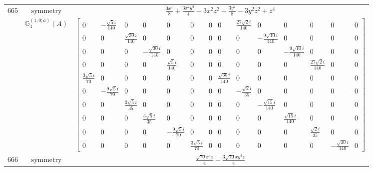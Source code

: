 \documentclass[fleqn,8pt,landscape]{jsarticle}
\begin{document}
\begin{longtable}{ccc}
$ 665 $ & $ \text{symmetry} $ & $ \frac{3 x^{4}}{8} + \frac{3 x^{2} y^{2}}{4} - 3 x^{2} z^{2} + \frac{3 y^{4}}{8} - 3 y^{2} z^{2} + z^{4} $ \\
$  $ & $ \mathbb{G}_{4}^{(1,0;a)}(A) $ & $ \begin{bmatrix} 0 & - \frac{\sqrt{5} i}{140} & 0 & 0 & 0 & 0 & 0 & 0 & \frac{27 \sqrt{2} i}{140} & 0 & 0 & 0 & 0 & 0 \\ 0 & 0 & \frac{\sqrt{30} i}{140} & 0 & 0 & 0 & 0 & 0 & 0 & - \frac{9 \sqrt{10} i}{140} & 0 & 0 & 0 & 0 \\ 0 & 0 & 0 & - \frac{\sqrt{30} i}{140} & 0 & 0 & 0 & 0 & 0 & 0 & - \frac{9 \sqrt{10} i}{140} & 0 & 0 & 0 \\ 0 & 0 & 0 & 0 & \frac{\sqrt{5} i}{140} & 0 & 0 & 0 & 0 & 0 & 0 & \frac{27 \sqrt{2} i}{140} & 0 & 0 \\ \frac{3 \sqrt{5} i}{70} & 0 & 0 & 0 & 0 & 0 & 0 & \frac{\sqrt{30} i}{140} & 0 & 0 & 0 & 0 & 0 & 0 \\ 0 & - \frac{9 \sqrt{5} i}{70} & 0 & 0 & 0 & 0 & 0 & 0 & - \frac{\sqrt{2} i}{35} & 0 & 0 & 0 & 0 & 0 \\ 0 & 0 & \frac{3 \sqrt{5} i}{35} & 0 & 0 & 0 & 0 & 0 & 0 & - \frac{\sqrt{15} i}{140} & 0 & 0 & 0 & 0 \\ 0 & 0 & 0 & \frac{3 \sqrt{5} i}{35} & 0 & 0 & 0 & 0 & 0 & 0 & \frac{\sqrt{15} i}{140} & 0 & 0 & 0 \\ 0 & 0 & 0 & 0 & - \frac{9 \sqrt{5} i}{70} & 0 & 0 & 0 & 0 & 0 & 0 & \frac{\sqrt{2} i}{35} & 0 & 0 \\ 0 & 0 & 0 & 0 & 0 & \frac{3 \sqrt{5} i}{70} & 0 & 0 & 0 & 0 & 0 & 0 & - \frac{\sqrt{30} i}{140} & 0 \end{bmatrix} $ \\ \hline
$ 666 $ & $ \text{symmetry} $ & $ \frac{\sqrt{70} x^{3} z}{4} - \frac{3 \sqrt{70} x y^{2} z}{4} $ \\

\end{longtable}
\end{document}
